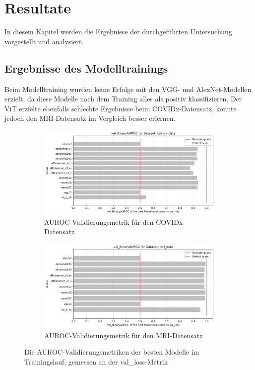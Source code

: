 \section{Resultate}
In diesem Kapitel werden die Ergebnisse der durchgeführten Untersuchung vorgestellt und analysiert.

\subsection{Ergebnisse des Modelltrainings} \label{chap:ergebnisse-modelltraining}
Beim Modelltraining wurden keine Erfolge mit den VGG- und AlexNet-Modellen erzielt, da diese Modelle nach dem Training alles als positiv klassifizieren. Der ViT erzielte ebenfalls schlechte Ergebnisse beim COVIDx-Datensatz, konnte jedoch den MRI-Datensatz im Vergleich besser erlernen.

\begin{figure}[ht!]
    \centering
    \begin{subfigure}{0.5\linewidth}
        \centering
        \includegraphics[height=0.5\linewidth]{01-images/05-resultate/val_binaryAUROC_COVIDX.png}
        \caption{AUROC-Validierungsmetrik für den COVIDx-Datensatz}
    \end{subfigure}\hfill%
    \begin{subfigure}{0.5\linewidth}
        \centering
        \includegraphics[height=0.5\linewidth]{01-images/05-resultate/val_binaryAUROC_MRI.png}
        \caption{AUROC-Validierungsmetrik für den MRI-Datensatz}
    \end{subfigure}
    \caption{Die AUROC-Validierungsmetriken der besten Modelle im Trainingslauf, gemessen an der val\_loss-Metrik}
\end{figure}

